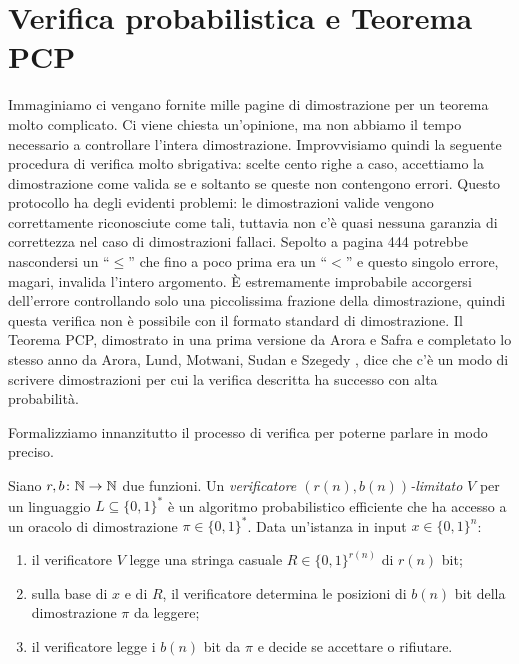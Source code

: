 \section{Verifica probabilistica e Teorema PCP}

Immaginiamo ci vengano fornite mille pagine di dimostrazione per un teorema
molto complicato. Ci viene chiesta un'opinione, ma non abbiamo il tempo
necessario a controllare l'intera dimostrazione.
Improvvisiamo quindi la seguente procedura di verifica molto sbrigativa:
scelte cento righe a caso, accettiamo la dimostrazione come valida se e soltanto
se queste non contengono errori. Questo protocollo ha degli evidenti problemi:
le dimostrazioni valide vengono correttamente riconosciute come tali, tuttavia
non c'è quasi nessuna garanzia di correttezza nel caso di dimostrazioni
fallaci. Sepolto a pagina 444 potrebbe nascondersi un ``$\le$'' che fino a poco
prima era un ``$<$'' e questo singolo errore, magari, invalida l'intero argomento.
È estremamente improbabile accorgersi dell'errore controllando solo una
piccolissima frazione della dimostrazione, quindi questa verifica non è
possibile con il formato standard di dimostrazione.
Il Teorema PCP, dimostrato in una prima versione da Arora e Safra \cite{AS98} e
completato lo stesso anno da Arora, Lund, Motwani, Sudan e Szegedy \cite{ALMSS98},
dice che c'è un modo di scrivere dimostrazioni per cui la verifica descritta ha
successo con alta probabilità.

Formalizziamo innanzitutto il processo di verifica per poterne parlare in modo preciso.

\begin{definition}
	Siano $r, b\colon \mathbb{N} \to \mathbb{N}$ due funzioni. Un \emph{verificatore $(r(n), b(n))$-limitato}
	$V$ per un linguaggio $L \subseteq \{0,1\}^*$ è un algoritmo probabilistico
	efficiente che ha accesso a un oracolo di dimostrazione $\pi \in \{0, 1\}^*$.
	Data un'istanza in input $x \in \{0,1\}^n$:
	\begin{enumerate}
		\item il verificatore $V$ legge una stringa casuale $R \in \{0,1\}^{r(n)}$
			di $r(n)$ bit;
		\item sulla base di $x$ e di $R$, il verificatore determina le posizioni di
			$b(n)$ bit della dimostrazione $\pi$ da leggere;
		\item il verificatore legge i $b(n)$ bit da $\pi$ e decide se accettare
			o rifiutare.
	\end{enumerate}
\end{definition}

